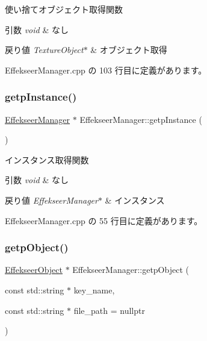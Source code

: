 使い捨てオブジェクト取得関数 


\begin{DoxyParams}{引数}
{\em void} & なし \\
\hline
\end{DoxyParams}

\begin{DoxyRetVals}{戻り値}
{\em Texture\+Object$\ast$} & オブジェクト取得 \\
\hline
\end{DoxyRetVals}


 Effekseer\+Manager.\+cpp の 103 行目に定義があります。

\mbox{\label{class_effekseer_manager_a51e3d2d397a8eb9514dcd072dfc35194}} 
\subsubsection{\texorpdfstring{getp\+Instance()}{getpInstance()}}
{\footnotesize\ttfamily \mbox{\hyperlink{class_effekseer_manager}{Effekseer\+Manager}} $\ast$ Effekseer\+Manager\+::getp\+Instance (\begin{DoxyParamCaption}{ }\end{DoxyParamCaption})\hspace{0.3cm}{\ttfamily [static]}}



インスタンス取得関数 


\begin{DoxyParams}{引数}
{\em void} & なし \\
\hline
\end{DoxyParams}

\begin{DoxyRetVals}{戻り値}
{\em Effekseer\+Manager$\ast$} & インスタンス \\
\hline
\end{DoxyRetVals}


 Effekseer\+Manager.\+cpp の 55 行目に定義があります。

\mbox{\label{class_effekseer_manager_ad5115f7429fe74a5ba1cccb227f232ea}} 
\subsubsection{\texorpdfstring{getp\+Object()}{getpObject()}}
{\footnotesize\ttfamily \mbox{\hyperlink{class_effekseer_object}{Effekseer\+Object}} $\ast$ Effekseer\+Manager\+::getp\+Object (\begin{DoxyParamCaption}\item[{const std\+::string $\ast$}]{key\+\_\+name,  }\item[{const std\+::string $\ast$}]{file\+\_\+path = {\ttfamily nullptr} }\end{DoxyParamCaption})}



